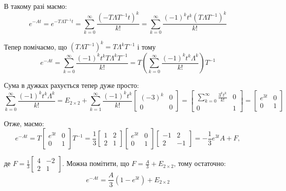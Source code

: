 \documentclass{hw_template}
\begin{document}
В такому разі маємо:
\begin{equation*}
    e^{-At} = e^{-T\Lambda T^{-1}t} = \sum_{k=0}^{\infty} \frac{(-T\Lambda T^{-1}t)^k}{k!} = \sum_{k=0}^{\infty} \frac{(-1)^kt^k(T\Lambda T^{-1})^k}{k!}
\end{equation*}

Тепер помічаємо, що $(T\Lambda T^{-1})^k = T\Lambda^k T^{-1}$ і тому
\begin{equation*}
    e^{-At} = \sum_{k=0}^{\infty} \frac{(-1)^kt^kT\Lambda^k T^{-1}}{k!} = T\left(\sum_{k=0}^{\infty} \frac{(-1)^k t^k\Lambda^k}{k!}\right)T^{-1}
\end{equation*}

Сума в дужках рахується тепер дуже просто:
\begin{equation*}
    \sum_{k=0}^{\infty} \frac{(-1)^k t^k\Lambda^k}{k!} = E_{2 \times 2} + \sum_{k=1}^{\infty} \frac{(-1)^kt^k}{k!}\begin{bmatrix}
        (-3)^k & 0 \\
        0 & 0
    \end{bmatrix} = \begin{bmatrix}
        \sum_{k=0}^{\infty} \frac{3^kt^k}{k!} & 0 \\
        0 & 1
    \end{bmatrix} = \begin{bmatrix}
        e^{3t} & 0 \\
        0 & 1
    \end{bmatrix}
\end{equation*}

Отже, маємо:
\begin{equation*}
    e^{-At} = T\begin{bmatrix}
        e^{3t} & 0 \\
        0 & 1
    \end{bmatrix}T^{-1} = \frac{1}{3}\begin{bmatrix}
        1 & 2 \\
        2 & 1
    \end{bmatrix}\begin{bmatrix}
        e^{3t} & 0 \\
        0 & 1
    \end{bmatrix}\begin{bmatrix}
        -1 & 2 \\
        2 & -1
    \end{bmatrix} = -\frac{1}{3}e^{3t}A + F,
\end{equation*}

де $F = \frac{1}{3}\begin{bmatrix}
    4 & -2 \\ 2 & 1
\end{bmatrix}$. Можна помітити, що $F=\frac{A}{3}+E_{2 \times 2}$, тому остаточно:
\begin{equation*}
    \boxed{e^{-At} = \frac{A}{3}(1-e^{3t}) + E_{2 \times 2}}
\end{equation*}
\end{document}
